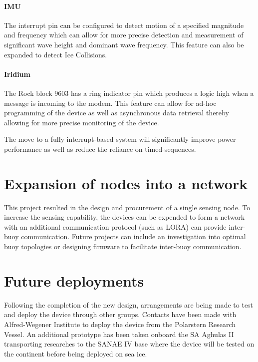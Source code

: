 \paragraph{IMU}
The interrupt pin can be configured to detect motion of a specified magnitude and frequency which can allow for more precise detection and measurement of significant wave height and dominant wave frequency. This feature can also be expanded to detect Ice Collisions.

\paragraph{Iridium}

The Rock block 9603 has a ring indicator pin which produces a logic high when a message is incoming to the modem. This feature can allow for ad-hoc programming of the device as well as asynchronous data retrieval thereby allowing for more precise monitoring of the device. 

The move to a fully interrupt-based system will significantly improve power performance as well as reduce the reliance on timed-sequences.

\section{Expansion of nodes into a network}

This project resulted in the design and procurement of a single sensing node. To increase the sensing capability, the devices can be expended to form a network with an additional communication protocol (such as LORA) can provide inter-buoy communication. Future projects can include an investigation into optimal buoy topologies or designing firmware to facilitate inter-buoy communication.

\section{Future deployments}

Following the completion of the new design, arrangements are being made to test and deploy the device through other groups. Contacts have been made with Alfred-Wegener Institute to deploy the device from the Polarstern Research Vessel. An additional prototype has been taken onboard the SA Aghulas II transporting researches to the SANAE IV base where the device will be tested on the continent before being deployed on sea ice.
